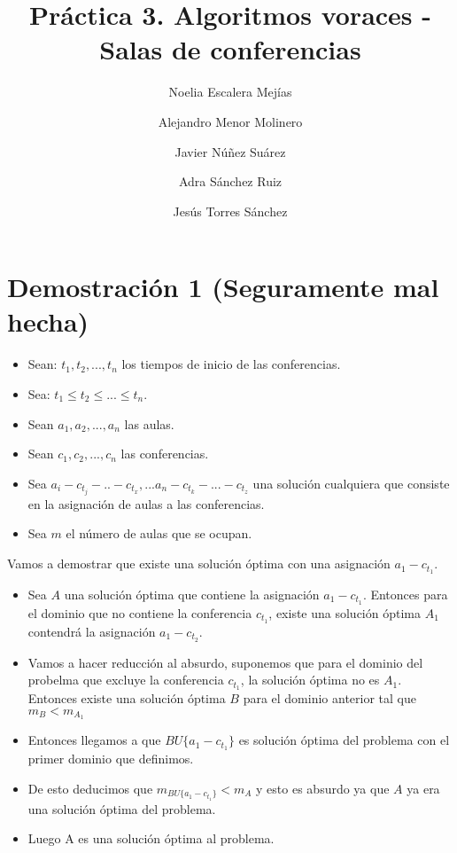 \documentclass{article}
\title{Práctica 3. Algoritmos voraces - Salas de conferencias}
\author{Noelia Escalera Mejías \\
	\and Alejandro Menor Molinero \\
	\and Javier Núñez Suárez \\
	\and Adra Sánchez Ruiz \\
	\and Jesús Torres Sánchez}
\begin{document}
	\maketitle
	
	\section{Demostración 1 (Seguramente mal hecha)}
	\begin{itemize}
		\item Sean: $t_1,t_2,...,t_n$ los tiempos de inicio de las conferencias.
		\item Sea: $t_1\leq t_2 \leq ... \leq t_n$.
		\item Sean $a_1,a_2,...,a_n$ las aulas.
		\item Sean $c_1,c_2,...,c_n$ las conferencias.
		\item Sea $a_i-c_{t_j}-..-c_{t_x},...a_n-c_{t_k}-...-c_{t_z}$ una solución cualquiera que consiste en la asignación de aulas a las conferencias.
		\item Sea $m$ el número de aulas que se ocupan.
	\end{itemize}

	Vamos a demostrar que existe una solución óptima con una asignación $a_1-c_{t_1}$.
	
	\begin{itemize}
		\item Sea $A$ una solución óptima que contiene la asignación $a_1-c_{t_1}$. Entonces para el dominio que no contiene la conferencia $c_{t_1}$, existe una solución óptima $A_1$ contendrá la asignación $a_1-c_{t_2}$.
		
		\item Vamos a hacer reducción al absurdo, suponemos que para el dominio del probelma que excluye la conferencia $c_{t_1}$, la solución óptima no es $A_1$. Entonces existe una solución óptima $B$ para el dominio anterior tal que $m_B<m_{A_1}$
		
		\item Entonces llegamos a que $BU\{a_1-c_{t_1}\}$ es solución óptima del problema con el primer dominio que definimos.
		
		\item De esto deducimos que $m_{BU\{a_1-c_{t_1}\}}<m_A$ y esto es absurdo ya que $A$ ya era una solución óptima del problema.
		
		\item Luego A es una solución óptima al problema.
	\end{itemize}
\end{document}
